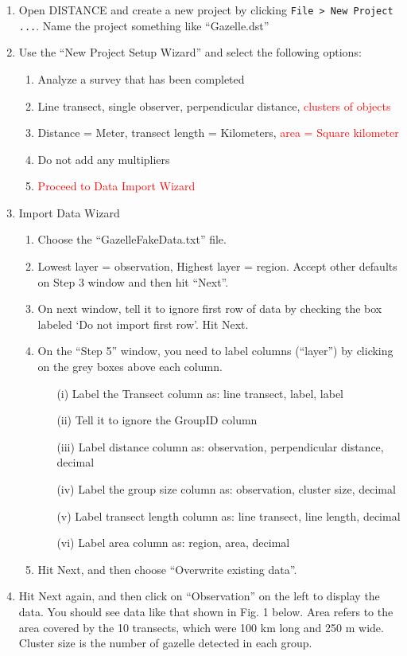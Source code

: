 \documentclass[12pt]{article}\usepackage[]{graphicx}\usepackage[]{color}
\begin{document}
\begin{enumerate}
\item Open DISTANCE and create a new project by clicking
  \verb+File > New Project ...+. Name the project something like
  ``Gazelle.dst''  
  \item Use the ``New Project Setup Wizard'' and select the
    following options: 
  \begin{enumerate}
    \item Analyze a survey that has been completed
    \item Line transect, single observer, perpendicular distance,
      \textcolor{red}{clusters of objects} 
    \item Distance = Meter, transect length = Kilometers,
      \textcolor{red}{area = Square kilometer}
    \item Do not add any multipliers
    \item \textcolor{red}{Proceed to Data Import Wizard}
  \end{enumerate}

  \item Import Data Wizard
  \begin{enumerate}
    \item Choose the ``GazelleFakeData.txt'' file. %
    \item Lowest layer = observation, Highest layer = region. Accept
      other defaults on Step 3 window and then hit ``Next''. 
    \item On next window, tell it to ignore first row of data by
      checking the box labeled `Do not import first row'. Hit Next. 
    \item On the ``Step 5'' window, you need to label columns
      (``layer'') by clicking on the grey boxes above each column. 
      \begin{itemize}
        \item[(i)] Label the Transect column as: line transect, label,
          label  
        \item[(ii)] Tell it to ignore the GroupID column
        \item[(iii)] Label distance column as: observation, perpendicular
          distance, decimal 
        \item[(iv)] Label the group size column as: observation, cluster
          size, decimal 
        \item[(v)] Label transect length column as: line transect, line
          length, decimal 
        \item[(vi)] Label area column as: region, area, decimal
      \end{itemize}
    \item Hit Next, and then choose ``Overwrite existing data''. 
  \end{enumerate}
  \item Hit Next again, and then click on ``Observation'' on the left to
    display the data. You should see data like that shown in Fig. 1
    below. Area refers to the area covered by the 10 transects,
    which were 100 km long and 250 m wide. Cluster size is the number
    of gazelle detected in each group. 
\end{enumerate}
\end{document}
